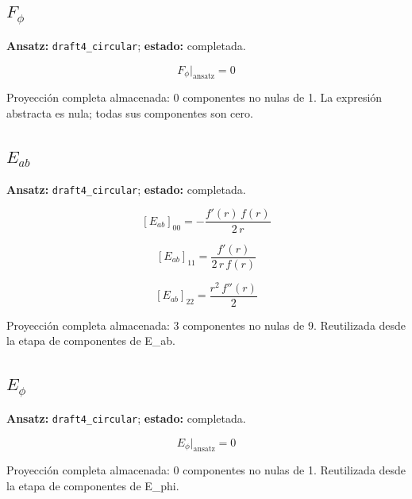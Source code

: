 \documentclass[11pt]{article}
\begin{document}
\subsection*{$ F_{\phi} $}
\textbf{Ansatz:} \texttt{draft4\_circular}; \textbf{estado:} completada.\par
\begin{dmath*}[breakdepth={5}]
F_{\phi}\big|_{\mathrm{ansatz}} = 0
\end{dmath*}
\par\smallskip
Proyección completa almacenada: 0 componentes no nulas de 1. La expresión abstracta es nula; todas sus componentes son cero.\par\medskip
{}
\subsection*{$ E_{ab} $}
\textbf{Ansatz:} \texttt{draft4\_circular}; \textbf{estado:} completada.\par
\begin{dmath*}[breakdepth={5}]
\left[E_{ab}\right]_{00} = -\frac{f'\!\left(r\right)\,f\!\left(r\right)}{2\,r}
\end{dmath*}
\par\smallskip
\begin{dmath*}[breakdepth={5}]
\left[E_{ab}\right]_{11} = \frac{f'\!\left(r\right)}{2\,r\,f\!\left(r\right)}
\end{dmath*}
\par\smallskip
\begin{dmath*}[breakdepth={5}]
\left[E_{ab}\right]_{22} = \frac{{r}^{2}\,f''\!\left(r\right)}{2}
\end{dmath*}
\par\smallskip
Proyección completa almacenada: 3 componentes no nulas de 9. Reutilizada desde la etapa de componentes de E\_ab.\par\medskip
{}
\subsection*{$ E_{\phi} $}
\textbf{Ansatz:} \texttt{draft4\_circular}; \textbf{estado:} completada.\par
\begin{dmath*}[breakdepth={5}]
E_{\phi}\big|_{\mathrm{ansatz}} = 0
\end{dmath*}
\par\smallskip
Proyección completa almacenada: 0 componentes no nulas de 1. Reutilizada desde la etapa de componentes de E\_phi.\par\medskip
{}
\end{document}
